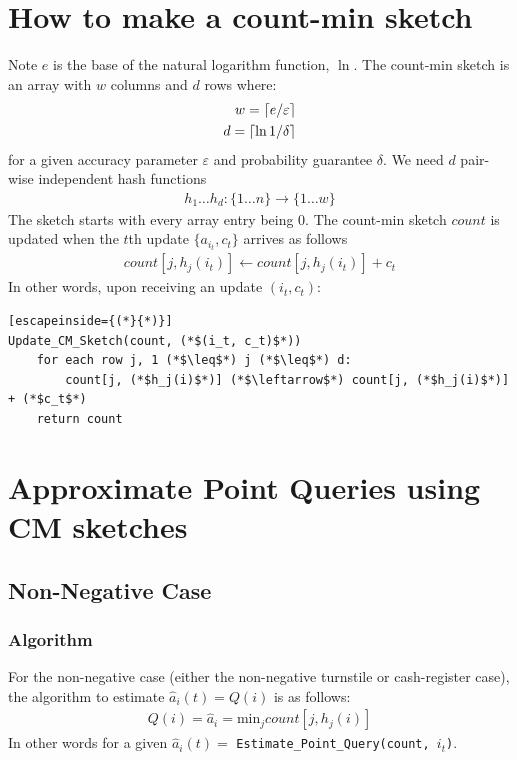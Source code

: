 \documentclass[11pt]{article}
\newcommand{\comment}[1]{}
\newcommand{\sq}{\mathit{Q}}
\DeclarePairedDelimiter\ceil{\lceil}{\rceil}
\newcommand{\ra}{\rightarrow}
\begin{document}
\section{How to make a count-min sketch}
Note $e$ is the base of the natural logarithm function, $\ln$. The count-min
sketch is an array with $w$ columns and $d$ rows where:
\begin{align}
    w = \ceil{e/\varepsilon}\\
    d = \ceil{\ln{1/\delta}}
\end{align}
for a given accuracy parameter $\varepsilon$ and probability guarantee $\delta$.
We need $d$ pair-wise independent hash functions
\begin{align}
    h_1 \dots h_d : \{1 \dots n\} \ra \{1 \dots w\} 
\end{align}
The sketch starts with every array entry being 0. The count-min sketch $count$
is updated when the $t$th update $\{a_{i_t}, c_t\}$ arrives as follows
\begin{align}
    count[j, h_j(i_t)] \leftarrow count[j, h_j(i_t)] + c_t     
\end{align}
In other words, upon receiving an update $(i_t, c_t)$:
\begin{lstlisting}[escapeinside={(*}{*)}]
Update_CM_Sketch(count, (*$(i_t, c_t)$*)) 
    for each row j, 1 (*$\leq$*) j (*$\leq$*) d:
        count[j, (*$h_j(i)$*)] (*$\leftarrow$*) count[j, (*$h_j(i)$*)] + (*$c_t$*)
    return count 
\end{lstlisting}

\comment{
\begin{enumerate}
    \item for each row $1 \leq j \leq d$
    \begin{enumerate}
        \item add $c_t$ to the $h_j(i)$th column.
    \end{enumerate}
\end{enumerate}
}


\section{Approximate Point Queries using CM sketches}

\subsection{Non-Negative Case}
\subsubsection{Algorithm}
For the non-negative case (either the non-negative turnstile or cash-register case),
the algorithm to estimate $\hat{a}_i(t) = \sq(i)$ is as follows: 
\begin{align}
    \sq(i) = \hat{a}_i = \text{min}_j count[j, h_j(i)]
\end{align}
In other words for a given $\hat a_i(t) =$ \texttt{Estimate\_Point\_Query(count, $i_t$)}.
\end{document}
